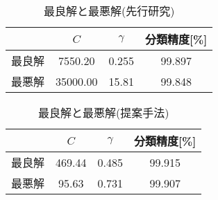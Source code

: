 \clearpage
\begin{table}[tb]
  \centering
  \caption{最良解と最悪解(先行研究)}  %
  \begin{tabular}{|c|c|c|c|}  %
      \hline  %
      &$C$ &$\gamma$ &分類精度[\%] \\  %
      \hline  %
    最良解 &7550.20& 0.255&99.897 \\  %
      \hline  %
    最悪解  &35000.00&15.81 &99.848\\  %
      \hline  %
  \end{tabular}
  \label{myparam2}  %
\end{table}
\begin{table}[tb]
  \centering
  \caption{最良解と最悪解(提案手法)}  %
  \begin{tabular}{|c|c|c|c|}  %
      \hline  %
      &$C$ &$\gamma$ &分類精度[\%] \\  %
      \hline  %
    最良解&469.44&0.485&99.915\\  %
      \hline  %
    最悪解 &95.63 &0.731&99.907\\  %
      \hline  %
  \end{tabular}
  \label{myparam1}  %
\end{table}